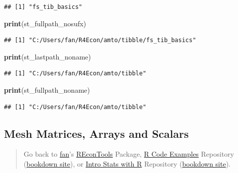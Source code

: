 \documentclass[
]{book}
\newenvironment{Shaded}{\begin{snugshade}}{\end{snugshade}}
\newcommand{\KeywordTok}[1]{\textcolor[rgb]{0.13,0.29,0.53}{\textbf{#1}}}
\newcommand{\NormalTok}[1]{#1}
\begin{document}
\begin{verbatim}
## [1] "fs_tib_basics"
\end{verbatim}

\begin{Shaded}
\begin{Highlighting}[]
\KeywordTok{print}\NormalTok{(st\_fullpath\_nosufx)}
\end{Highlighting}
\end{Shaded}

\begin{verbatim}
## [1] "C:/Users/fan/R4Econ/amto/tibble/fs_tib_basics"
\end{verbatim}

\begin{Shaded}
\begin{Highlighting}[]
\KeywordTok{print}\NormalTok{(st\_lastpath\_noname)}
\end{Highlighting}
\end{Shaded}

\begin{verbatim}
## [1] "C:/Users/fan/R4Econ/amto/tibble"
\end{verbatim}

\begin{Shaded}
\begin{Highlighting}[]
\KeywordTok{print}\NormalTok{(st\_fullpath\_noname)}
\end{Highlighting}
\end{Shaded}

\begin{verbatim}
## [1] "C:/Users/fan/R4Econ/amto/tibble"
\end{verbatim}

\hypertarget{mesh-matrices-arrays-and-scalars}{%
\subsection{Mesh Matrices, Arrays and Scalars}\label{mesh-matrices-arrays-and-scalars}}

\begin{quote}
Go back to \href{http://fanwangecon.github.io/}{fan}'s \href{https://fanwangecon.github.io/REconTools/}{REconTools} Package, \href{https://fanwangecon.github.io/R4Econ/}{R Code Examples} Repository (\href{https://fanwangecon.github.io/R4Econ/bookdown}{bookdown site}), or \href{https://fanwangecon.github.io/Stat4Econ/}{Intro Stats with R} Repository (\href{https://fanwangecon.github.io/Stat4Econ/bookdown}{bookdown site}).
\end{quote}
\end{document}
